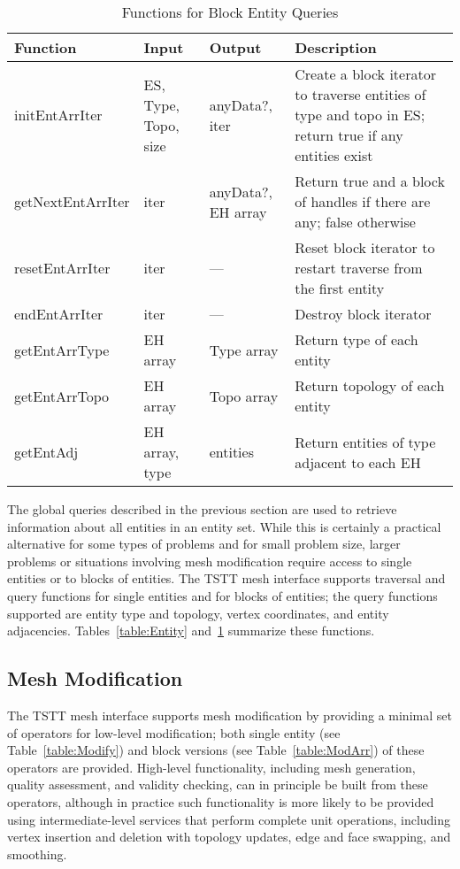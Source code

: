 \begin{table}[tbp]
\caption{Functions for Block Entity Queries}\label{table:EntArr}
{\small
\begin{tabular}{|p{1.25in}|p{0.75in}|p{0.75in}|p{223pt}|}
\hline 
Function&
Input&
Output&
Description\tabularnewline
\hline
\hline 
initEntArrIter&
ES, Type, Topo, size&
anyData?, iter&
Create a block iterator to traverse entities of type and topo in ES;
return true if any entities exist\tabularnewline
\hline 
getNextEntArrIter&
iter&
anyData?, EH array&
Return true and a block of handles if there are any; false otherwise\tabularnewline
\hline 
resetEntArrIter&
iter&
---&
Reset block iterator to restart traverse from the first entity\tabularnewline
\hline 
endEntArrIter&
iter&
---&
Destroy block iterator\tabularnewline
\hline 
\hline 
getEntArrType&
EH array&
Type array&
Return type of each entity\tabularnewline
\hline 
getEntArrTopo&
EH array&
Topo array&
Return topology of each entity\tabularnewline
\hline 
getEntAdj&
EH array, type&
entities&
Return entities of type adjacent to each EH\tabularnewline
\hline
\end{tabular}
}
\end{table}

The global queries described in the previous section are used to
retrieve information about all entities in an entity set. While this is
certainly a practical alternative for some types of problems and for
small problem size, larger problems or situations involving mesh
modification require access to single entities or to blocks of
entities. The TSTT mesh interface supports traversal and query functions
for single entities and for blocks of entities; the query functions
supported are entity type and topology, vertex coordinates, and entity
adjacencies.  Tables~\ref{table:Entity} and~\ref{table:EntArr} summarize
these functions.

\subsection{Mesh Modification\label{sub:Mesh-Modification}}


The TSTT mesh interface supports mesh modification by providing a
minimal set of operators for low-level modification; both single entity
(see Table~\ref{table:Modify}) and block versions (see
Table~\ref{table:ModArr}) of these operators are provided.  High-level
functionality, including mesh generation, quality assessment, and
validity checking, can in principle be built from these operators,
although in practice such functionality is more likely to be provided
using intermediate-level services that perform complete unit operations,
including vertex insertion and deletion with topology updates, edge and
face swapping, and smoothing.

